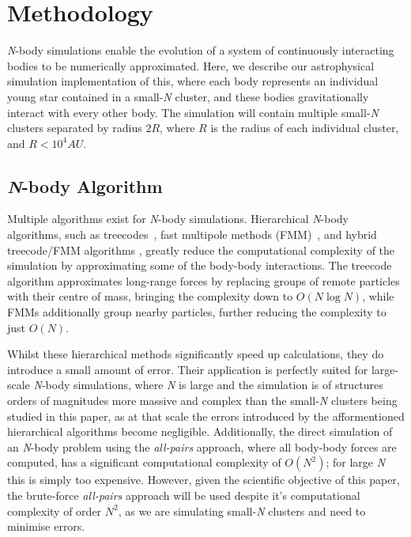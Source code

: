 
\section{Methodology}
{\slshape N\/}-body simulations enable the evolution of a system of continuously interacting bodies to be numerically approximated. Here, we describe our astrophysical simulation implementation of this, where each body represents an individual young star contained in a small-{\slshape N\/} cluster, and these bodies gravitationally interact with every other body. The simulation will contain multiple small-{\slshape N\/} clusters separated by radius $2R$, where $R$ is the radius of each individual cluster, and $R<10^{4}AU$.

\subsection{{\slshape N\/}-body Algorithm}
Multiple algorithms exist for {\slshape N\/}-body simulations. Hierarchical {\slshape N\/}-body algorithms, such as treecodes~\parencite{barnesHierarchicalLogForcecalculation1986}, fast multipole methods (FMM)~\parencite{lfFastAlgorithmParticle2001}, and hybrid treecode/FMM algorithms {\parencites{dehnenHierarchicalForceCalculation2002}{chengFastAdaptiveMultipole1999a}}, greatly reduce the computational complexity of the simulation by approximating some of the body-body interactions. The treecode algorithm approximates long-range forces by replacing groups of remote particles with their centre of mass, bringing the complexity down to $O(N \log N)$, while FMMs additionally group nearby particles, further reducing the complexity to just $O(N)$.

Whilst these hierarchical methods significantly speed up calculations, they do introduce a small amount of error. Their application is perfectly suited for large-scale {\slshape N\/}-body simulations, where {\slshape N\/} is large and the simulation is of structures orders of magnitudes more massive and complex than the small-{\slshape N\/} clusters being studied in this paper, as at that scale the errors introduced by the afformentioned hierarchical algorithms become negligible. Additionally, the direct simulation of an {\slshape N\/}-body problem using the {\slshape all-pairs\/} approach, where all body-body forces are computed, has a significant computational complexity of $O(N^2)$; for large {\slshape N\/} this is simply too expensive. However, given the scientific objective of this paper, the brute-force {\slshape all-pairs\/} approach will be used despite it's computational complexity of order $N^2$, as we are simulating small-{\slshape N\/} clusters and need to minimise errors.

